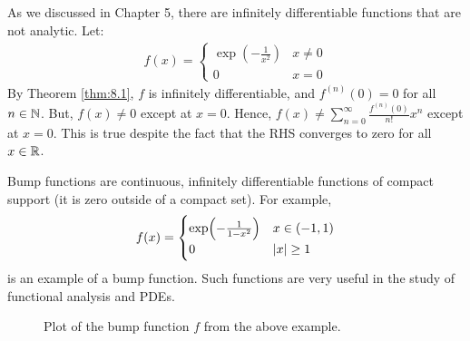 \begin{nexample}{}{}
    As we discussed in Chapter 5, there are infinitely differentiable functions that are not analytic. Let:
    \begin{align*}
        f(x) = \begin{cases}
            \exp(-\frac{1}{x^2}) & x \neq 0
            \\ 0 & x = 0
        \end{cases}
    \end{align*}
    By Theorem \ref{thm:8.1}, $f$ is infinitely differentiable, and $f^{(n)}(0) = 0$ for all $n \in \mathbb{N}$. But, $f(x) \neq 0$ except at $x = 0$. Hence, $f(x) \neq \sum_{n=0}^\infty \frac{f^{(n)}(0)}{n!}x^n$ except at $x = 0$. This is true despite the fact that the RHS converges to zero for all $x \in \mathbb{R}$. 
\end{nexample}

\begin{nexample}{}{}
    Bump functions are continuous, infinitely differentiable functions of compact support (it is zero outside of a compact set). For example, 
    \begin{align*}
        f(x) = \begin{cases}
            \exp(-\frac{1}{1-x^2}) & x \in (-1, 1)
            \\ 0 & \abs{x} \geq 1
        \end{cases}
    \end{align*}
    is an example of a bump function. Such functions are very useful in the study of functional analysis and PDEs.
\end{nexample}
\begin{figure}[htbp]
    \centering
    
    \caption{Plot of the bump function $f$ from the above example.}
    \label{fig50}
\end{figure}

